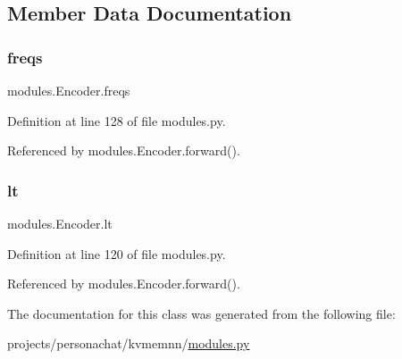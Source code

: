 \subsection{Member Data Documentation}
\mbox{\label{classmodules_1_1Encoder_aa03887967c20ff1b62aa6927c54fd1ba}} 
\subsubsection{\texorpdfstring{freqs}{freqs}}
{\footnotesize\ttfamily modules.\+Encoder.\+freqs}



Definition at line 128 of file modules.\+py.



Referenced by modules.\+Encoder.\+forward().

\mbox{\label{classmodules_1_1Encoder_a2ad9010a1e3b0929c72af620d17d5fd2}} 
\subsubsection{\texorpdfstring{lt}{lt}}
{\footnotesize\ttfamily modules.\+Encoder.\+lt}



Definition at line 120 of file modules.\+py.



Referenced by modules.\+Encoder.\+forward().



The documentation for this class was generated from the following file\+:\begin{DoxyCompactItemize}
\item 
projects/personachat/kvmemnn/\hyperlink{projects_2personachat_2kvmemnn_2modules_8py}{modules.\+py}\end{DoxyCompactItemize}
